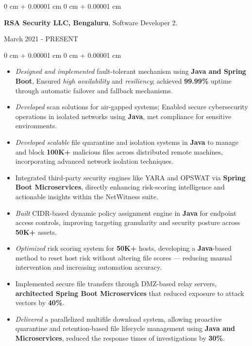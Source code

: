 \documentclass[10pt, letterpaper]{article}
\newenvironment{highlights}{
    \begin{itemize}[
        topsep=0.10 cm,
        parsep=0.10 cm,
        partopsep=0pt,
        itemsep=0pt,
        leftmargin=0 cm + 10pt
    ]
}{
    \end{itemize}
} %
\newenvironment{onecolentry}{
    \begin{adjustwidth}{
        0 cm + 0.00001 cm
    }{
        0 cm + 0.00001 cm
    }
}{
    \end{adjustwidth}
} %
\newenvironment{twocolentry}[2][]{
    \onecolentry
    \def\secondColumn{#2}
    \setcolumnwidth{\fill, 4.5 cm}
    \begin{paracol}{2}
}{
    \switchcolumn \raggedleft \secondColumn
    \end{paracol}
    \endonecolentry
} %
\begin{document}
        \begin{twocolentry}{March 2021 - PRESENT}
          \textbf{RSA Security LLC, Bengaluru}, Software Developer 2.
        \end{twocolentry}
        \vspace{0.10 cm}
        \begin{onecolentry}
            \begin{highlights}
\item \textit{Designed and implemented} fault-tolerant mechanism using \textbf{Java and Spring Boot}, Ensured \textit{high availability} and \textit{resiliency}; achieved \textbf{99.99\%} uptime through automatic failover and fallback mechanisms.

\item \textit{Developed} scan solutions for air-gapped systems; Enabled secure cybersecurity operations in isolated networks using \textbf{Java}, met compliance for sensitive environments.

\item \textit{Developed scalable} file quarantine and isolation systems in \textbf{Java} to manage and block \textbf{100K+} malicious files across distributed remote machines, incorporating advanced network isolation techniques.

\item Integrated third-party security engines like YARA and OPSWAT via \textbf{Spring Boot Microservices}, directly enhancing risk-scoring intelligence and actionable insights within the NetWitness suite.

\item \textit{Built} CIDR-based dynamic policy assignment engine in \textbf{Java} for endpoint access controls, improving targeting granularity and security posture across \textbf{50K+} assets.

\item \textit{Optimized} risk scoring system for \textbf{50K+} hosts, developing a \textbf{Java}-based method to reset host risk without altering file scores — reducing manual intervention and increasing automation accuracy.

\item Implemented secure file transfers through DMZ-based relay servers, \textbf{architected Spring Boot Microservices} that reduced exposure to attack vectors by \textbf{40\%}.

\item \textit{Delivered} a parallelized multifile download system, allowing proactive quarantine and retention-based file lifecycle management using \textbf{Java and Microservices}, reduced the response times of investigations by \textbf{ 30\%}.

    \end{highlights}
        \end{onecolentry}
\end{document}
